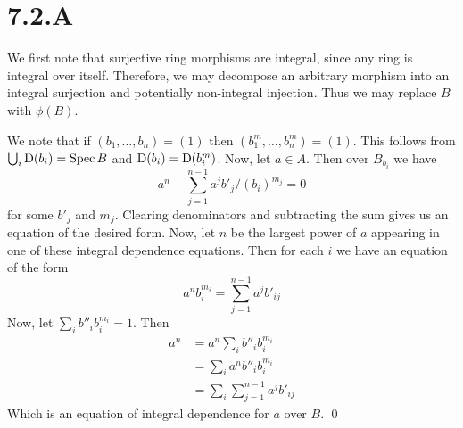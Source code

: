 \documentclass{article}
\begin{document}
\section{7.2.A}
We first note that surjective ring morphisms are integral, since any ring is
integral over itself. Therefore, we may decompose an arbitrary morphism into an
integral surjection and potentially non-integral injection. Thus we may replace
$B$ with $\phi(B)$.

We note that if $(b_1, \dots, b_n)=(1)$ then $(b_1^m, \dots, b_n^m)=(1)$. This
follows from $\bigcup_i \operatorname{D}(b_i)=\operatorname{Spec} B$ and $\operatorname{D}(b_i)=\operatorname{D}(b_i^m)$. Now, let $a
    \in A$. Then over $B_{b_i}$ we have
\[
    a^n+\sum_{j=1}^{n-1} a^jb'_j/(b_i)^{m_j}=0
\]
for some $b'_j$ and $m_j$. Clearing denominators and subtracting the sum gives
us an equation of the desired form. Now, let $n$ be the largest power of $a$
appearing in one of these integral dependence equations. Then for each $i$ we
have an equation of the form
\[
    a^nb_i^{m_i}=\sum_{j=1}^{n-1} a^jb'_{ij}
\]
Now, let $\sum_i b''_ib_i^{m_i}=1$. Then
\begin{align*}
    a^n & =a^n\sum_i b''_ib_i^{m_i}          \\
        & =\sum_i a^nb''_ib_i^{m_i}          \\
        & =\sum_i\sum_{j=1}^{n-1} a^jb'_{ij}
\end{align*}
Which is an equation of integral dependence for $a$ over $B$. \qed
\end{document}
